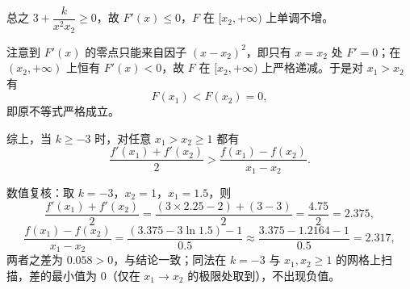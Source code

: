 \begin{answer}
总之 $3+\dfrac{k}{x^2x_2}\geqslant0$，故 $F'(x)\leqslant0$，$F$ 在 $[x_2,+\infty)$ 上单调不增。

注意到 $F'(x)$ 的零点只能来自因子 $(x-x_2)^2$，即只有 $x=x_2$ 处 $F'=0$；在 $(x_2,+\infty)$ 上恒有 $F'(x)<0$，故 $F$ 在 $[x_2,+\infty)$ 上严格递减。于是对 $x_1>x_2$ 有
\nopagebreak[4]
\[F(x_1)<F(x_2)=0,\]
即原不等式严格成立。

综上，当 $k\geqslant-3$ 时，对任意 $x_1>x_2\geqslant1$ 都有
\nopagebreak[4]
\[\frac{f'(x_1)+f'(x_2)}2>\frac{f(x_1)-f(x_2)}{x_1-x_2}.\]

数值复核：取 $k=-3$，$x_2=1$，$x_1=1.5$，则
\nopagebreak[4]
\[\frac{f'(x_1)+f'(x_2)}2=\frac{(3\times2.25-2)+(3-3)}2=\frac{4.75}2=2.375,\]
\nopagebreak[4]
\[\frac{f(x_1)-f(x_2)}{x_1-x_2}=\frac{(3.375-3\ln1.5)-1}{0.5}\approx\frac{3.375-1.2164-1}{0.5}=2.317,\]
两者之差为 $0.058>0$，与结论一致；同法在 $k=-3$ 与 $x_1,x_2\geqslant1$ 的网格上扫描，差的最小值为 $0$（仅在 $x_1\to x_2$ 的极限处取到），不出现负值。



\end{answer}